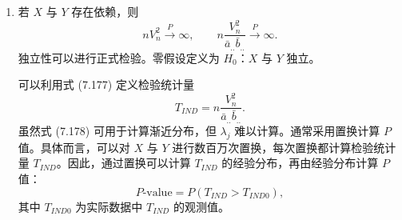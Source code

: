 \begin{enumerate}
\begin{enumerate}[label=\alph*.]
\begin{equation}
n\frac{V_n^2}{\bar a_{..}\bar b_{..}}\xrightarrow D Q,
\tag{7.177}
\end{equation}
其中
\begin{equation}
Q=\sum_{j=1}^\infty\lambda_jZ_j^2,
\tag{7.178}
\end{equation}
$Z_j$ 为独立正态随机变量，$\lambda_j$ 为由 $(X,Y)$ 的分布决定的非负常数，且 $E[Q]=1$。
\item 若 $X$ 与 $Y$ 存在依赖，则
\begin{equation}
nV_n^2\xrightarrow P\infty,\qquad
n\frac{V_n^2}{\bar a_{..}\bar b_{..}}\xrightarrow P\infty.
\tag{7.179}
\end{equation}
独立性可以进行正式检验。零假设定义为 $H_0$：$X$ 与 $Y$ 独立。

可以利用式 (7.177) 定义检验统计量
\begin{equation}
T_{IND}=n\frac{V_n^2}{\bar a_{..}\bar b_{..}}.
\tag{7.180}
\end{equation}
虽然式 (7.178) 可用于计算渐近分布，但 $\lambda_j$ 难以计算。通常采用置换计算 $P$ 值。具体而言，可以对 $X$ 与 $Y$ 进行数百万次置换，每次置换都计算检验统计量 $T_{IND}$。因此，通过置换可以计算 $T_{IND}$ 的经验分布，再由经验分布计算 $P$ 值：
\[
P\text{-value}=P(T_{IND}>T_{IND0}),
\]
其中 $T_{IND0}$ 为实际数据中 $T_{IND}$ 的观测值。
\end{enumerate}
\end{enumerate}
